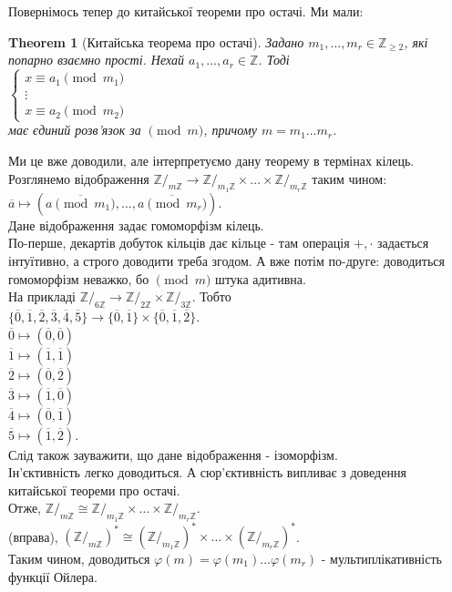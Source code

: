 \documentclass[a4paper, 10pt]{article}
\theoremstyle{theoremdd}
\newtheorem{theorem}{Theorem}[subsection]
\theoremstyle{theoremdd}
\theoremstyle{theoremdd}
\theoremstyle{theoremdd}
\theoremstyle{theoremdd}
\theoremstyle{theoremdd}
\theoremstyle{theoremdd}
\theoremstyle{theoremdd}
\begin{document}
Повернімось тепер до китайської теореми про остачі. Ми мали:
\begin{theorem}[Китайська теорема про остачі]
Задано $m_1,\dots,m_r \in \mathbb{Z}_{\geq 2}$, які попарно взаємно прості. Нехай $a_1,\dots,a_r \in \mathbb{Z}$. Тоді\\
$\begin{cases} x \equiv a_1 \pmod{m_1} \\ \vdots \\ x \equiv a_2 \pmod{m_2} \end{cases}$\\
має єдиний розв'язок за $\pmod m$, причому $m = m_1 \dots m_r$.
\end{theorem}
Ми це вже доводили, але інтерпретуємо дану теорему в термінах кілець.\\
Розглянемо відображення $\mathbb{Z}/_{m \mathbb{Z}} \to \mathbb{Z}/_{m_1 \mathbb{Z}} \times \dots \times \mathbb{Z}/_{m_r \mathbb{Z}}$ таким чином:\\
$\overline{a} \mapsto (\overline{a \pmod {m_1}}, \dots, \overline{a \pmod {m_r}} )$.\\
Дане відображення задає гомоморфізм кілець.\\
По-перше, декартів добуток кільців дає кільце - там операція $+,\cdot$ задається інтуїтивно, а строго доводити треба згодом. А вже потім по-друге: доводиться гомоморфізм неважко, бо $\pmod m$ штука адитивна.
\bigskip \\
На прикладі $\mathbb{Z}/_{6 \mathbb{Z}} \to \mathbb{Z}/_{2 \mathbb{Z}} \times \mathbb{Z}/_{3 \mathbb{Z}}$. Тобто\\
$\{ \overline{0},\overline{1},\overline{2},\overline{3},\overline{4},\overline{5} \} \to \{\overline{0},\overline{1}\} \times \{\overline{0},\overline{1},\overline{2}\}$.\\
$\overline{0} \mapsto (\overline{0},\overline{0})$\\
$\overline{1} \mapsto (\overline{1},\overline{1})$\\
$\overline{2} \mapsto (\overline{0},\overline{2})$\\
$\overline{3} \mapsto (\overline{1},\overline{0})$\\
$\overline{4} \mapsto (\overline{0},\overline{1})$\\
$\overline{5} \mapsto (\overline{1},\overline{2})$.
\bigskip \\
Слід також зауважити, що дане відображення - ізоморфізм.\\
Ін'єктивність легко доводиться. А сюр'єктивність випливає з доведення китайської теореми про остачі.\\
Отже, $\mathbb{Z}/_{m \mathbb{Z}} \cong \mathbb{Z}/_{m_1 \mathbb{Z}} \times \dots \times \mathbb{Z}/_{m_r \mathbb{Z}}$.\\
(вправа), $(\mathbb{Z}/_{m \mathbb{Z}})^* \cong (\mathbb{Z}/_{m_1 \mathbb{Z}})^* \times \dots \times (\mathbb{Z}/_{m_r \mathbb{Z}})^*$.\\
Таким чином, доводиться $\varphi(m) = \varphi(m_1) \dots \varphi(m_r)$ - мультиплікативність функції Ойлера.
\end{document}
